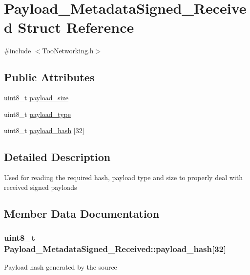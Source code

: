 \hypertarget{structPayload__MetadataSigned__Received}{}\section{Payload\+\_\+\+Metadata\+Signed\+\_\+\+Received Struct Reference}
\label{structPayload__MetadataSigned__Received}


{\ttfamily \#include $<$Too\+Networking.\+h$>$}

\subsection*{Public Attributes}
\begin{DoxyCompactItemize}
\item 
uint8\+\_\+t \hyperlink{structPayload__MetadataSigned__Received_a3d2d5a1f14940bbc0435dc1fec8fb238}{payload\+\_\+size}
\item 
uint8\+\_\+t \hyperlink{structPayload__MetadataSigned__Received_aad832d1e40428c42d4cac30012eacc02}{payload\+\_\+type}
\item 
uint8\+\_\+t \hyperlink{structPayload__MetadataSigned__Received_a6c37ad37ff363c7480fa99836fbdc0c5}{payload\+\_\+hash} \mbox{[}32\mbox{]}
\end{DoxyCompactItemize}


\subsection{Detailed Description}
Used for reading the required hash, payload type and size to properly deal with received signed payloads 

\subsection{Member Data Documentation}
\subsubsection[{\texorpdfstring{payload\+\_\+hash}{payload_hash}}]{\setlength{\rightskip}{0pt plus 5cm}uint8\+\_\+t Payload\+\_\+\+Metadata\+Signed\+\_\+\+Received\+::payload\+\_\+hash\mbox{[}32\mbox{]}}\hypertarget{structPayload__MetadataSigned__Received_a6c37ad37ff363c7480fa99836fbdc0c5}{}\label{structPayload__MetadataSigned__Received_a6c37ad37ff363c7480fa99836fbdc0c5}
Payload hash generated by the source 
